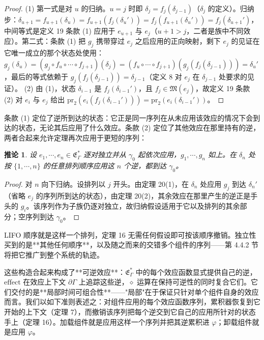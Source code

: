 \documentclass[11pt,a4paper]{article}
\theoremstyle{plain}
\newtheorem{corollary}[theorem]{推论}
\theoremstyle{definition}
\theoremstyle{remark}
\begin{document}
\begin{proof}
(1) 第一式是对 $u$ 的归纳。$u = j$ 时即 $\delta_j = f_j(\delta_{j-1})$（$\delta_j$ 的定义）。归纳步：$\delta_{u+1} = f_{u+1}(\delta_u) = f_{u+1}(f_j(\delta_u')) = f_j(f_{u+1}(\delta_u')) = f_j(\delta_{u+1}')$，中间等式是定义 19 条款 (1) 应用于 $e_{u+1}$ 与 $e_j$（$u+1 > j$，二者是族中不同效应）。第二式：条款 (1) 把 $g_j$ 携带穿过 $e_j$ 之后应用的正向映射，剩下 $e_j$ 的见证在它唯一成立的那个状态处使用：
$g_j(\delta_u) = (g_j \circ f_u \circ \cdots \circ f_{j+1})(\delta_j) = (f_u \circ \cdots \circ f_{j+1})(g_j(f_j(\delta_{j-1}))) = \delta_u'$，最后的等式依赖于 $g_j(f_j(\delta_{j-1})) = \delta_{j-1}$（定义 8 对 $e_j$ 在 $\delta_{j-1}$ 处要求的见证）。
(2) 由 (1)，状态 $\delta_{i-1}$ 是 $f_j(\delta_{i-1}')$，且 $f_j \in \mathfrak{M}(e_j)$，故定义 19 条款 (2) 对 $e_i$ 与 $e_j$ 给出 $\mathrm{pr}_2(e_i(f_j(\delta_{i-1}'))) = \mathrm{pr}_2(e_i(\delta_{i-1}'))$。
\end{proof}

条款 (1) 定位了逆所到达的状态：它正是同一序列在从未应用该效应的情况下会到达的状态，无论其后应用了什么效应。条款 (2) 定位了其他效应在那里持有的逆，两者合起来允许定理再次应用于更短的序列：

\begin{corollary}\label{cor:any-order-revert}
设 $e_1, \cdots, e_n \in \mathfrak{E}_\Gamma^\ast$ 逐对独立并从 $\gamma_0$ 起依次应用，$g_1, \cdots, g_n$ 如上。在 $\delta_n$ 处按 $\{1, \cdots, n\}$ 的任意排列顺序应用这 $n$ 个逆，都到达 $\gamma_0$。
\end{corollary}

\begin{proof}
对 $n$ 向下归纳。设排列以 $j$ 开头。由定理 20(1)，在 $\delta_n$ 处应用 $g_j$ 到达 $\delta_n'$（省略 $e_j$ 的序列所到达的状态），由定理 20(2)，其余效应在那里产生的逆正是手头的 $g_i$。该序列作为子族仍逐对独立，故归纳假设适用于它以及排列的其余部分；空序列到达 $\gamma_0$。
\end{proof}

LIFO 顺序就是这样一个排列，定理 16 无需任何假设即可按该顺序撤销。独立性买到的是**其他任何顺序**，以及随之而来的交错多个组件的序列——第 4.4.2 节将把它推广到整个系统的轨迹。

这些构造合起来构成了**可逆效应**：$\mathfrak{E}_\Gamma^\ast$ 中的每个效应函数显式提供自己的逆，$\mathrm{effect}$ 在效应上下文 $\partial\Gamma$ 上追踪这些逆，$\diamond$ 运算在保持可逆性的同时复合它们。它们交付的是**局部时间可组合性**——"局部"在于保证只针对单个组件自身的效应而言。我们以如下准则表述之：对组件应用的每个效应函数序列，累积器恢复到它开始的上下文（定理 7），而撤销该序列把每个逆交到它自己的应用所针对的状态手上（定理 16）。加载组件就是应用这样一个序列并把其逆累积进 $\varphi$；卸载组件就是应用 $\varphi$。
\end{document}
